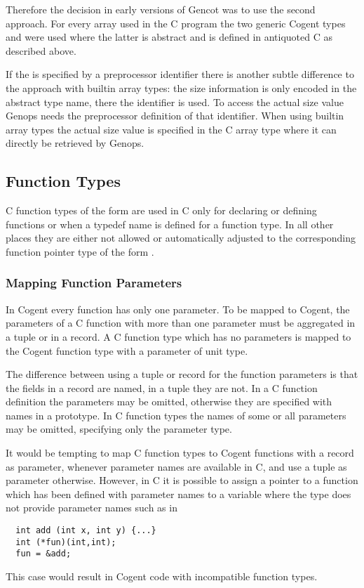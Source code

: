 Therefore the decision in early versions of Gencot was to use the second approach. For every array  used in the C 
program the two generic Cogent types  and  were used where the latter is
abstract and is defined in antiquoted C as described above.

If the  is specified by a preprocessor identifier there is another subtle difference to the approach 
with builtin array types: the size information is only encoded in the abstract type name, 
there the identifier is used. To access the actual size value Genops needs the preprocessor definition of that
identifier. When using builtin array types the actual size value is specified in the C array type where it can 
directly be retrieved by Genops.

\subsection{Function Types}
\label{design-types-function}

C function types of the form  are used in C only for declaring or defining functions or
when a typedef name is defined for a function type. In all other
places they are either not allowed or automatically adjusted to the corresponding function pointer type
of the form . 

\subsubsection{Mapping Function Parameters}

In Cogent every function
has only one parameter. To be mapped to Cogent, the parameters of a C function with more than one parameter must
be aggregated in a tuple or in a record. A C function type  which has no parameters is mapped
to the Cogent function type  with a parameter of unit type.

The difference between using a tuple or record for the function parameters is that the fields in a 
record are named, in a tuple they are not. In 
a C function definition the parameters may be omitted, otherwise they are specified with names in a prototype.
In C function types the names of some or all parameters may be omitted, specifying only the parameter type.

It would be tempting to map C function types to Cogent functions with a record as parameter, whenever parameter 
names are available in C, and use a tuple as parameter otherwise. However, in C it is possible to assign a 
pointer to a function which has been defined 
with parameter names to a variable where the type does not provide parameter names such as in 
\begin{verbatim}
  int add (int x, int y) {...}
  int (*fun)(int,int);
  fun = &add;
\end{verbatim}
This case would result in Cogent code with incompatible function types.

